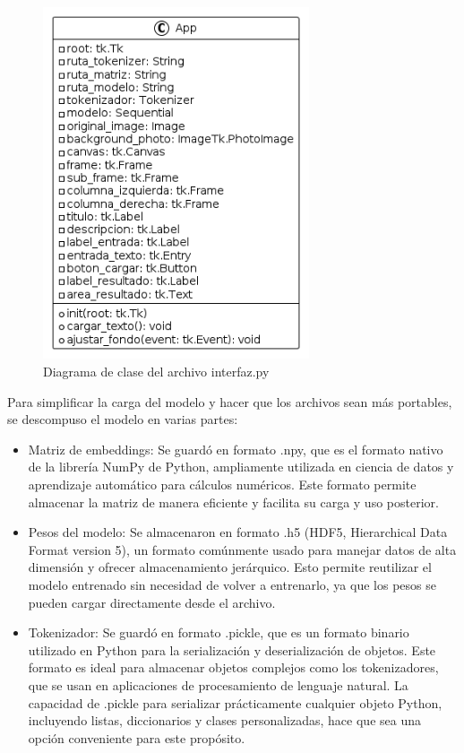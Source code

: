 \begin{itemize}
\begin{figure}
	\includegraphics[width=0.7\textwidth]{capitulo5/figuras/fig13.png}
	\caption{Diagrama de clase del archivo interfaz.py}
	\label{fig:uml13}
\end{figure}

\end{itemize}

Para simplificar la carga del modelo y hacer que los archivos sean más portables, se descompuso el modelo en varias partes:

\begin{itemize}

\item Matriz de embeddings: Se guardó en formato .npy, que es el formato nativo de la librería NumPy de Python, ampliamente utilizada en ciencia de datos y aprendizaje automático para cálculos numéricos. Este formato permite almacenar la matriz de manera eficiente y facilita su carga y uso posterior.

\item Pesos del modelo: Se almacenaron en formato .h5 (HDF5, Hierarchical Data Format version 5), un formato comúnmente usado para manejar datos de alta dimensión y ofrecer almacenamiento jerárquico. Esto permite reutilizar el modelo entrenado sin necesidad de volver a entrenarlo, ya que los pesos se pueden cargar directamente desde el archivo.

\item Tokenizador: Se guardó en formato .pickle, que es un formato binario utilizado en Python para la serialización y deserialización de objetos. Este formato es ideal para almacenar objetos complejos como los tokenizadores, que se usan en aplicaciones de procesamiento de lenguaje natural. La capacidad de .pickle para serializar prácticamente cualquier objeto Python, incluyendo listas, diccionarios y clases personalizadas, hace que sea una opción conveniente para este propósito.

\end{itemize}


